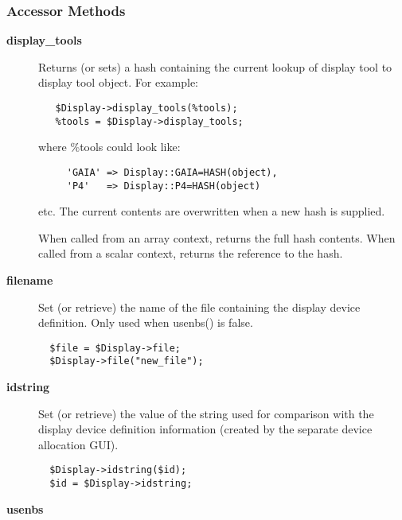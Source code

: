 \subsubsection*{Accessor Methods\label{ORAC::Display_Accessor_Methods}}
\begin{description}

\item[{\textbf{display\_tools}}] \mbox{}

Returns (or sets) a hash containing the current lookup of display tool
to display tool object. For example:

\begin{verbatim}
   $Display->display_tools(%tools);
   %tools = $Display->display_tools;
\end{verbatim}


where \%tools could look like:

\begin{verbatim}
     'GAIA' => Display::GAIA=HASH(object),
     'P4'   => Display::P4=HASH(object)
\end{verbatim}


etc. The current contents are overwritten when a new hash is supplied.



When called from an array context, returns the full hash contents.
When called from a scalar context, returns the reference to the hash.


\item[{\textbf{filename}}] \mbox{}

Set (or retrieve) the name of the file containing the display device
definition. Only used when usenbs() is false.

\begin{verbatim}
  $file = $Display->file;
  $Display->file("new_file");
\end{verbatim}

\item[{\textbf{idstring}}] \mbox{}

Set (or retrieve) the value of the string used for comparison
with the display device definition information (created by the
separate device allocation GUI).

\begin{verbatim}
  $Display->idstring($id);
  $id = $Display->idstring;
\end{verbatim}

\item[{\textbf{usenbs}}] \mbox{}


\end{description}
